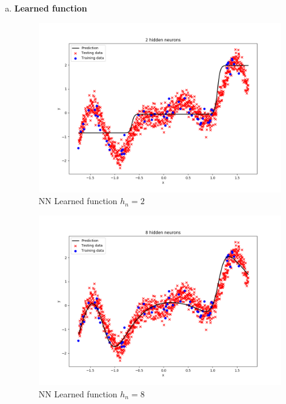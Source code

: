 \documentclass[12pt,a4paper]{article}
\begin{document}
\begin{enumerate}[a)]
  
  
  \item \textbf{Learned function}
  
\begin{figure}[H]
	\centering
  \includegraphics[width=\textwidth]{figures/1_1_a_hn_2.png}
	\caption{NN Learned function $h_n=2$}
	\label{1_1_a_hn_2}
\end{figure}

\begin{figure}[H]
	\centering
  \includegraphics[width=\textwidth]{figures/1_1_a_hn_8.png}
	\caption{NN Learned function $h_n=8$}
	\label{1_1_a_hn_8}
\end{figure}


\end{enumerate}
\end{document}
